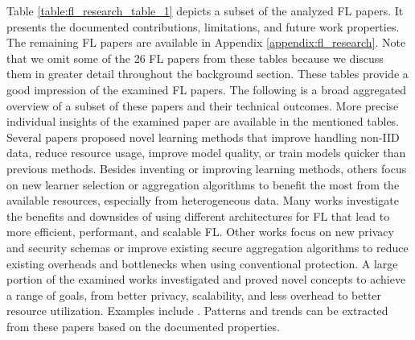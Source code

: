 Table \ref{table:fl_research_table_1} depicts a subset of the analyzed FL papers.
It presents the documented contributions, limitations, and future work properties.
The remaining FL papers are available in Appendix \ref{appendix:fl_research}.
Note that we omit some of the 26 FL papers from these tables because we discuss them in greater detail throughout the background section.
These tables provide a good impression of the examined FL papers.
The following is a broad aggregated overview of a subset of these papers and their technical outcomes.
More precise individual insights of the examined paper are available in the mentioned tables.
Several papers \cite{paper:fl_inference_anytime_anywhere,paper:hfl_with_momentum_acceleration_in_multi_tier_networks,paper:model_pruning_for_edge_fl,paper:tackling_objective_inconsistency_problem_in_heterogeneous_fl} proposed novel learning methods that improve handling non-IID data, reduce resource usage, improve model quality, or train models quicker than previous methods.
Besides inventing or improving learning methods, others \cite{paper:refl_resource_efficient_fl,paper:edge_fl_via_mqtt_and_oma_lightweight_m2m,paper:fedat_high_performance_communication_efficient_fl_with_asynch_tiers} focus on new learner selection or aggregation algorithms to benefit the most from the available resources, especially from heterogeneous data.
Many works \cite{paper:edgefl_framework,paper:global_fl_platform_for_iot,paper:adaptive_exper_models_for_pfl} investigate the benefits and downsides of using different architectures for FL that lead to more efficient, performant, and scalable FL.
Other works \cite{paper:hfl_with_privacy, paper:cluster_based_secure_aggregation_for_fl,paper:efficient_privacy_preserving_ml_in_hierarchical_distributed_systems} focus on new privacy and security schemas or improve existing secure aggregation algorithms to reduce existing overheads and bottlenecks when using conventional protection.
A large portion of the examined works investigated and proved novel concepts to achieve a range of goals, from better privacy, scalability, and less overhead to better resource utilization.
Examples include \cite{paper:decentralized_edge_intelligence_dynamic_resource_allocation_framework_hfl,hpfl_over_massive_mobile_edge_computing_networks,paper:fl_toward_on_demand_client_deployment_at_edge}.
Patterns and trends can be extracted from these papers based on the documented properties.

\begin{figure}[p]
    
\end{figure}

